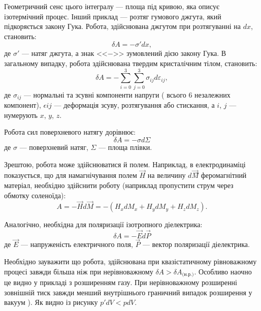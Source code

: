 Геометричний сенс цього інтегралу --- площа під кривою, яка описує ізотермічний процес. Інший приклад --- розтяг гумового джгута, який підкоряється закону Гука. Робота, здійснювана джгутом при розтягуванні на $dx$, становить:
\begin{equation*}
    \delta A = -\sigma' dx,
\end{equation*}
де $\sigma'$ --- натяг джгута, а знак <<$-$>> зумовлений дією закону Гука. В загальному випадку, робота здійснювана твердим кристалічним тілом, становить:
\begin{equation*}
    \delta A = -\sum\limits_{i = 0}^{3}\sum\limits_{j = 0}^{3}\sigma_{ij}d\varepsilon_{ij},
\end{equation*}
де $\sigma_{ij}$ --- нормальні та зсувні компоненти напруги ( всього 6 незалежних компонент),   $\epsilon{ij}$ --- деформація зсуву, розтягування або стискання, а $i$, $j$ --- нумерують $x$, $y$, $z$.

Робота сил поверхневого натягу дорівнює:
\begin{equation*}
   \delta A = -\sigma d\Sigma
\end{equation*}
де $\sigma$ --- поверхневий натяг, $\Sigma$ --- площа плівки.

Зрештою, робота може здійснюватися й полем. Наприклад, в електродинаміці показується, що для намагнічування полем $\vec{H}$ на величину $d\vec{M}$⃗ феромагнітний матеріал, необхідно здійснити роботу (наприклад пропустити струм через обмотку соленоїда):
\begin{equation*}
    A=-\vec{H} d\vec{M} = - (H_x dM_x+H_y dM_y + H_z dM_z).
\end{equation*}

Аналогічно, необхідна для поляризації ізотропного діелектрика:
\begin{equation*}
    \delta A = - \vec{E} d\vec{P}
\end{equation*}
де $\vec{E}$ --- напруженість електричного поля, $\vec{P}$ --- вектор поляризації діелектрика.

Необхідно зауважити що робота, здійснювана при квазістатичному рівноважному процесі завжди більша ніж при нерівноважному $\delta A > \delta A_{\text{(н.р.)}}$. Особливо наочно це видно у прикладі з розширенням газу. При нерівноважному розширенні зовнішній тиск завжди менший внутрішнього  граничний випадок розширення у вакуум ). Як видно із рисунку $p' dV < p dV$.



